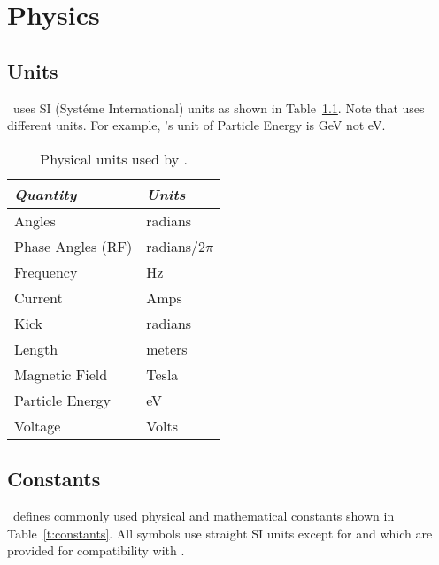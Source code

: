 \chapter{Physics}

\section{Units}
\label{s:units}

\bmad\ uses SI (Syst\'eme International) units as shown in
Table~\ref{t:units}.  Note that \MAD uses different units. For example,
\mad's unit of Particle Energy is GeV not eV.
\begin{table}[h]
\centering
\begin{tabular}{|l|l|} \hline
  {\em Quantity}     & {\em Units}       \\ \hline
  Angles             &    radians        \\ 
  Phase Angles (RF)  &    radians/2$\pi$ \\ 
  Frequency          &    Hz             \\ 
  Current            &    Amps           \\ 
  Kick               &    radians        \\ 
  Length             &    meters         \\ 
  Magnetic Field     &    Tesla          \\ 
  Particle Energy    &    eV             \\ 
  Voltage            &    Volts          \\ \hline
\end{tabular}
\caption{Physical units used by \bmad.}
\label{t:units}
\end{table}


\section{Constants}
\label{s:constants}

\bmad\ defines commonly used physical and mathematical constants
shown in Table~\ref{t:constants}.  All symbols use straight SI units
except for  and  which are provided for
compatibility with \MAD.

